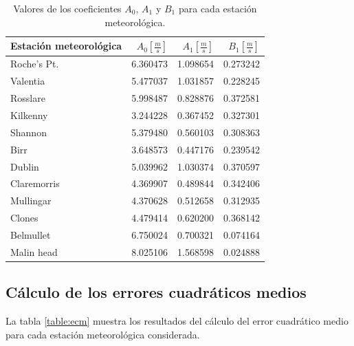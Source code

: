 \documentclass[journal, monochrome]{IEEEtran}
\begin{document}
\begin{table}
	\begin{center}
		\begin{tabular}{l|r|r|r}
			Estación meteorológica & $A_{0} [\frac{m}{s}]$ & $A_{1} [\frac{m}{s}]$ & $B_{1} [\frac{m}{s}]$ \\
			\hline
			Roche's Pt. & 6.360473 & 1.098654 & 0.273242\\ 
			Valentia & 5.477037 & 1.031857 & 0.228245 \\
			Rosslare & 5.998487 & 0.828876 & 0.372581 \\
			Kilkenny & 3.244228 & 0.367452 & 0.327301 \\
			Shannon & 5.379480 & 0.560103 & 0.308363 \\
			Birr & 3.648573 & 0.447176 & 0.239542 \\
			Dublin & 5.039962 & 1.030374 & 0.370597 \\
			Claremorris & 4.369907 & 0.489844 & 0.342406 \\
			Mullingar & 4.370628 & 0.512658 & 0.312935 \\
			Clones & 4.479414 & 0.620200 & 0.368142 \\
			Belmullet & 6.750024 & 0.700321 & 0.074164 \\
			Malin head & 8.025106 & 1.568598 & 0.024888 \\
		\end{tabular}
		\caption{Valores de los coeficientes $A_{0}$, $A_{1}$ y $B_{1}$ para cada estación meteorológica.}
		\label{table:ls}
	\end{center}
\end{table}

\vspace{0.5cm}
\subsection{Cálculo de los errores cuadráticos medios}
\par
La tabla \ref{table:ecm} muestra los resultados del cálculo del error cuadrático medio para cada estación meteorológica considerada.
\end{document}
